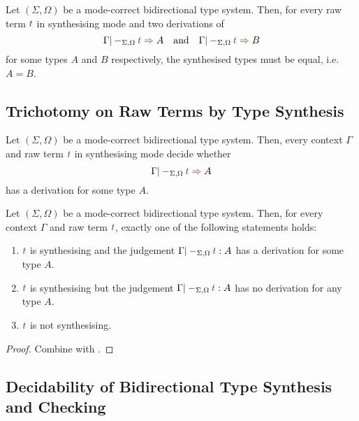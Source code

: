 \begin{lemma}\label{thm:unique-syn}
  Let $(\Sigma, \Omega)$ be a mode-correct bidirectional type system.
  Then, for every raw term $\isTerm{t}$ in synthesising mode and two derivations of 
  \[
    \Gamma |-_{\Sigma, \Omega} \isTerm{t} \syn A
    \quad\text{and}\quad
    \Gamma |-_{\Sigma, \Omega} \isTerm{t} \syn B
  \]
  for some types $A$ and $B$ respectively, the synthesised types must be equal, i.e.\ $A = B$.
\end{lemma}
 

\subsection{Trichotomy on Raw Terms by Type Synthesis} \label{subsec:trichotomy}

\begin{theorem} \label{thm:bidirectional-type-synthesis}
  Let $(\Sigma, \Omega)$ be a mode-correct bidirectional type system.
  Then, every context $\Gamma$ and raw term $\isTerm{t}$ in synthesising mode decide whether
  \[
    \Gamma |-_{\Sigma, \Omega} \isTerm{t} \syn A
  \]
  has a derivation for some type $A$.
\end{theorem}

\begin{corollary}\label{cor:trichotomy}
  Let $(\Sigma, \Omega)$ be a mode-correct bidirectional type system.
  Then, for every context $\Gamma$ and raw term $\isTerm{t}$, exactly one of the following statements holds:
  \begin{enumerate}
    \item $\isTerm{t}$ is synthesising and the judgement $\Gamma |-_{\Sigma, \Omega} \isTerm{t} : A$ has a derivation for some type $A$.
    \item $\isTerm{t}$ is synthesising but the judgement $\Gamma |-_{\Sigma, \Omega} \isTerm{t} : A$ has no derivation for any type $A$.
    \item $\isTerm{t}$ is not synthesising.
  \end{enumerate}
\end{corollary}
\begin{proof}
  Combine   with .
  
\end{proof}

\subsection{Decidability of Bidirectional Type Synthesis and Checking}\label{subsec:bidirectional-synthesis-checking}


